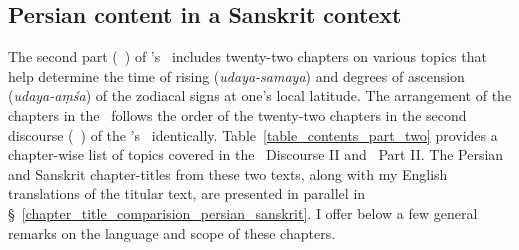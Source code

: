 \subsection{Persian content in a Sanskrit context}
\label{comparative_overview_chapters_zij_sindhu}

The second part (\dvitiya\ \kanda) of \Nityananda's \Siddhantasindhu\ includes twenty-two chapters on various topics that help determine the time of rising (\textit{udaya-samaya}) and degrees of ascension (\textit{udaya-aṃśa}) of the zodiacal signs at one's local latitude. The arrangement of the chapters in the \Siddhantasindhu\ follows the order of the twenty-two chapters in the second discourse (\maqala\idafaconsonant\ \duvum) of the \MullaFarid's \ZijiShahJahani\ identically. Table~\ref{table_contents_part_two} provides a chapter-wise list of topics covered in the \ZijiShahJahani\ Discourse II and \Siddhantasindhu\ Part II. The Persian and Sanskrit chapter-titles from these two texts, along with my English translations of the titular text, are presented in parallel in \S~\ref{chapter_title_comparision_persian_sanskrit}. I offer below a few general remarks on the language and scope of these chapters.

